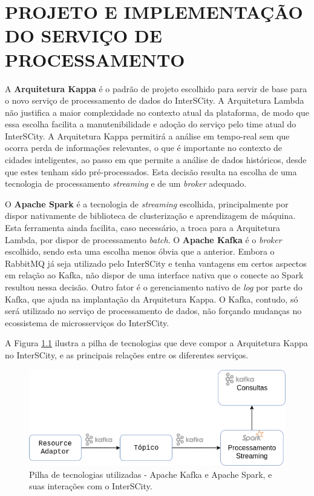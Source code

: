 \chapter[PROJETO E IMPLEMENTAÇÃO DO SERVIÇO DE PROCESSAMENTO]{PROJETO E IMPLEMENTAÇÃO DO SERVIÇO DE PROCESSAMENTO}

\label{chapter:architecture}

A \textbf{Arquitetura Kappa} é o padrão de projeto escolhido para servir de
base para o novo serviço de processamento de dados do InterSCity. A Arquitetura
Lambda não justifica a maior complexidade no contexto atual da plataforma, de
modo que essa escolha facilita a manutenibilidade e adoção do serviço pelo
time atual do InterSCity. A Arquitetura Kappa permitirá a análise em tempo-real
sem que ocorra perda de informações relevantes, o que é importante no contexto de
cidades inteligentes, ao passo em que permite a análise de dados históricos,
desde que estes tenham sido pré-processados. Esta decisão resulta na escolha de
uma tecnologia de processamento \textit{streaming} e de um
\textit{broker} adequado.

O \textbf{Apache Spark} é a tecnologia de \textit{streaming} escolhida,
principalmente por dispor nativamente de biblioteca de clusterização e
aprendizagem de máquina. Esta ferramenta ainda facilita, caso necessário, a
troca para a Arquitetura Lambda, por dispor de processamento \textit{batch}.
O \textbf{Apache Kafka} é o \textit{broker} escolhido, sendo esta uma escolha
menos óbvia que a anterior. Embora o RabbitMQ já seja utilizado pelo
InterSCity e tenha vantagens em certos aspectos em relação ao Kafka, não
dispor de uma interface nativa que o conecte ao Spark resultou nessa decisão.
Outro fator é o gerenciamento nativo de \textit{log} por parte do
Kafka, que ajuda na implantação da Arquitetura Kappa. O Kafka, contudo, só
será utilizado no serviço de processamento de dados, não forçando mudanças no
ecossistema de microsserviços do InterSCity.

A Figura \ref{fig:stack} ilustra a pilha de tecnologias que deve compor a
Arquitetura Kappa no InterSCity, e as principais relações entre os diferentes
serviços.

\begin{figure}
  \centering
    \includegraphics[scale=0.5]{figuras/kappa_tools2.png}
  \caption{Pilha de tecnologias utilizadas - Apache Kafka e Apache Spark, e suas
    interações com o InterSCity.}
  \label{fig:stack}
\end{figure}

